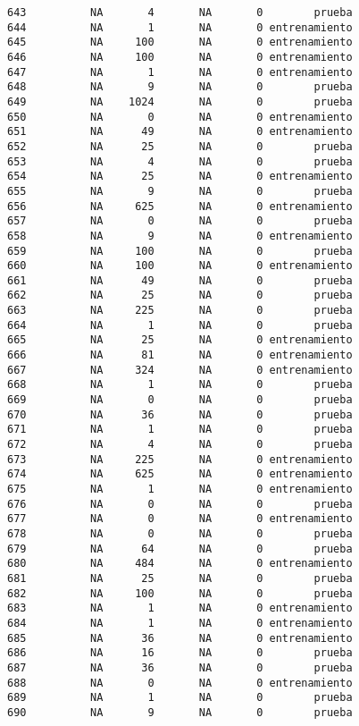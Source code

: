 \documentclass[
  letterpaper,
  DIV=11,
  numbers=noendperiod]{scrreprt}
\begin{document}
\begin{verbatim}
643          NA       4       NA       0        prueba
644          NA       1       NA       0 entrenamiento
645          NA     100       NA       0 entrenamiento
646          NA     100       NA       0 entrenamiento
647          NA       1       NA       0 entrenamiento
648          NA       9       NA       0        prueba
649          NA    1024       NA       0        prueba
650          NA       0       NA       0 entrenamiento
651          NA      49       NA       0 entrenamiento
652          NA      25       NA       0        prueba
653          NA       4       NA       0        prueba
654          NA      25       NA       0 entrenamiento
655          NA       9       NA       0        prueba
656          NA     625       NA       0 entrenamiento
657          NA       0       NA       0        prueba
658          NA       9       NA       0 entrenamiento
659          NA     100       NA       0        prueba
660          NA     100       NA       0 entrenamiento
661          NA      49       NA       0        prueba
662          NA      25       NA       0        prueba
663          NA     225       NA       0        prueba
664          NA       1       NA       0        prueba
665          NA      25       NA       0 entrenamiento
666          NA      81       NA       0 entrenamiento
667          NA     324       NA       0 entrenamiento
668          NA       1       NA       0        prueba
669          NA       0       NA       0        prueba
670          NA      36       NA       0        prueba
671          NA       1       NA       0        prueba
672          NA       4       NA       0        prueba
673          NA     225       NA       0 entrenamiento
674          NA     625       NA       0 entrenamiento
675          NA       1       NA       0 entrenamiento
676          NA       0       NA       0        prueba
677          NA       0       NA       0 entrenamiento
678          NA       0       NA       0        prueba
679          NA      64       NA       0        prueba
680          NA     484       NA       0 entrenamiento
681          NA      25       NA       0        prueba
682          NA     100       NA       0        prueba
683          NA       1       NA       0 entrenamiento
684          NA       1       NA       0 entrenamiento
685          NA      36       NA       0 entrenamiento
686          NA      16       NA       0        prueba
687          NA      36       NA       0        prueba
688          NA       0       NA       0 entrenamiento
689          NA       1       NA       0        prueba
690          NA       9       NA       0        prueba

\end{verbatim}
\end{document}
